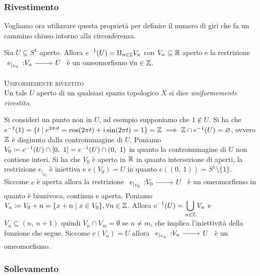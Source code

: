 \subsubsection{Rivestimento}
Vogliamo ora utilizzare questa proprietà per definire il numero di giri che fa un cammino chiuso intorno alla circonferenza.
\begin{lemming} \label{teo uniformemente rivestito}
	Sia $U\subsetneq S^1$ aperto. Allora $\displaystyle e^{-1}(U) = \amalg_{n\in\mathbb{Z}} V_n$ con $V_n\subseteq\mathbb{R}$ aperto e la restrizione $\funz {e_{|_{V_n}}} {V_n} U$ è un omeomorfismo $\forall n\in\mathbb{Z}$.
\end{lemming}
\begin{define} \textsc{Uniformemente rivestito}  \\
	Un tale $U$ aperto di un qualsiasi spazio topologico $X$ si dice \textit{uniformemente rivestito}.
\end{define}
\begin{demonstration}
	Si consideri un punto non in $U$, ad esempio supponiamo che $1\notin U$. Si ha che $e^{-1}(1)=\{t \mid e^{2\pi i t}=\cos(2\pi t)+i\sin(2\pi t)=1\}=\mathbb{Z} \implies \mathbb{Z} \cap e^{-1}(U)=\varnothing$, ovvero $\mathbb{Z}$ è disgiunto dalla controimmagine di $U$.\newline
	Poniamo $V_0\coloneqq e^{-1}(U)\cap \left[0,\ 1\right]= e^{-1}(U)\cap (0,\ 1)$ in quanto la controimmagine di $U$ non contiene interi. Si ha che $V_0$ è aperto in $\mathbb{R}$ in quanto intersezione di aperti, la restrizione $e_{|_{V_0}}$ è iniettiva e $e(V_0)=U$ in quanto $e\left( (0,\ 1) \right)=S^1\setminus\{1\}$. Siccome $e$ è aperta allora la restrizione $\funz {e_{|_{V_0}}} {V_0} U$ è un omeomorfismo in quanto è biunivoca, continua e aperta.\newline
	Poniamo $V_n\coloneqq V_0 +n=\{ x+n \mid x\in V_0\}, \forall n\in\mathbb{Z}$. Allora $\displaystyle e^{-1}(U)=\mathop{{\bigcup}}\displaylimits_{n\in\mathbb{Z}} V_n$ e $V_n\subseteq (n,\ n+1)$ quindi $V_n\cap V_m=\emptyset$ se $n\neq m$, che implica l'iniettività della funzione che segue. Siccome $e(V_n)=U$ allora $\funz  {e_{|_{V_n}}} {V_n} U$ è un omeomorfismo.
\end{demonstration}

\subsubsection{Sollevamento}

